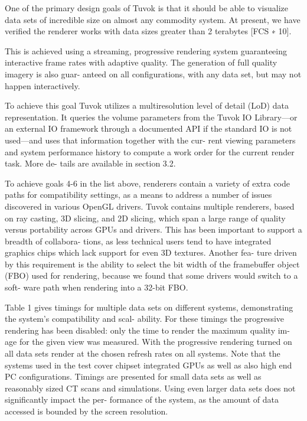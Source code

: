 One of the primary design goals of Tuvok is that it should be
able to visualize data sets of incredible size on almost any
commodity system. At present, we have verified the renderer
works with data sizes greater than 2 terabytes [FCS ∗ 10].

This is achieved using a streaming, progressive rendering
system guaranteeing interactive frame rates with adaptive
quality. The generation of full quality imagery is also guar-
anteed on all configurations, with any data set, but may not
happen interactively.

To achieve this goal Tuvok utilizes a multiresolution level
of detail (LoD) data representation. It queries the volume
parameters from the Tuvok IO Library—or an external IO
framework through a documented API if the standard IO is
not used—and uses that information together with the cur-
rent viewing parameters and system performance history to
compute a work order for the current render task. More de-
tails are available in section 3.2.

To achieve goals 4-6 in the list above, renderers contain
a variety of extra code paths for compatibility settings, as a
means to address a number of issues discovered in various
OpenGL drivers. Tuvok contains multiple renderers, based
on ray casting, 3D slicing, and 2D slicing, which span a large
range of quality versus portability across GPUs and drivers.
This has been important to support a breadth of collabora-
tions, as less technical users tend to have integrated graphics
chips which lack support for even 3D textures. Another fea-
ture driven by this requirement is the ability to select the bit
width of the framebuffer object (FBO) used for rendering,
because we found that some drivers would switch to a soft-
ware path when rendering into a 32-bit FBO.

Table 1 gives timings for multiple data sets on different
systems, demonstrating the system’s compatibility and scal-
ability. For these timings the progressive rendering has been
disabled: only the time to render the maximum quality im-
age for the given view was measured. With the progressive
rendering turned on all data sets render at the chosen refresh
rates on all systems. Note that the systems used in the test
cover chipset integrated GPUs as well as also high end PC
configurations. Timings are presented for small data sets as
well as reasonably sized CT scans and simulations. Using
even larger data sets does not significantly impact the per-
formance of the system, as the amount of data accessed is
bounded by the screen resolution.


